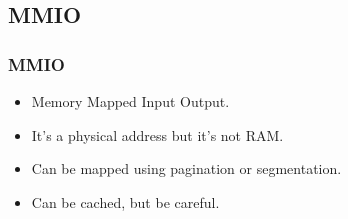 \begin{frame}
\begin{center}
\begin{overlayarea}{10cm}{10cm}
\end{overlayarea}
\end{center}
\end{frame}

\subsection{MMIO}
\begin{frame}
        \frametitle{MMIO}
        \begin{itemize}
        \item Memory Mapped Input Output.
        \item It's a physical address but it's not RAM.
        \item Can be mapped using pagination or segmentation.
        \item Can be cached, but be careful.
        \end{itemize}
\end{frame}

